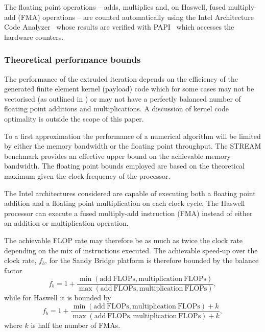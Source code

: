 \documentclass[11pt, a4paper]{scrartcl}
\begin{document}
The floating point operations -- adds, multiplies and, on Haswell,
fused multiply-add (FMA) operations -- are counted automatically using
the Intel Architecture Code Analyzer~\citep{iaca} whose results are
verified with PAPI~\citep{Mucci:1999} which accesses the hardware
counters.

\subsubsection{Theoretical performance bounds}
\label{sssec:performance-bounds}

The performance of the extruded iteration depends on the efficiency of
the generated finite element kernel (payload) code which for some
cases may not be vectorised (as outlined in \citet{Luporini:2015}) or
may not have a perfectly balanced number of floating point additions
and multiplications. A discussion of kernel code optimality is outside
the scope of this paper.

To a first approximation the performance of a numerical algorithm will
be limited by either the memory bandwidth or the floating point
throughput. The STREAM benchmark provides an effective upper bound on
the achievable memory bandwidth. The floating point bounds employed
are based on the theoretical maximum given the clock frequency of the
processor.

The Intel architectures considered are capable of executing both a
floating point addition and a floating point multiplication on each
clock cycle. The Haswell processor can execute a fused multiply-add
instruction (FMA) instead of either an addition or multiplication
operation.

The achievable FLOP rate may therefore be as much as twice the clock
rate depending on the mix of instructions executed. The achievable
speed-up over the clock rate, $f_{b}$, for the Sandy Bridge platform
is therefore bounded by the balance factor
\begin{equation}
f_{b} = 1 + \frac{\min(\mathrm{add\ FLOPs}, \mathrm{multiplication\ FLOPs})}  {\max(\mathrm{add\ FLOPs}, \mathrm{multiplication\ FLOPs})},
\end{equation}
while for Haswell it is bounded by
\begin{equation}
f_{b} = 1 + \frac{\min(\mathrm{add\ FLOPs}, \mathrm{multiplication\ FLOPs}) + k}  {\max(\mathrm{add\ FLOPs}, \mathrm{multiplication\ FLOPs}) + k},
\end{equation}
where $k$ is half the number of FMAs.
\end{document}
